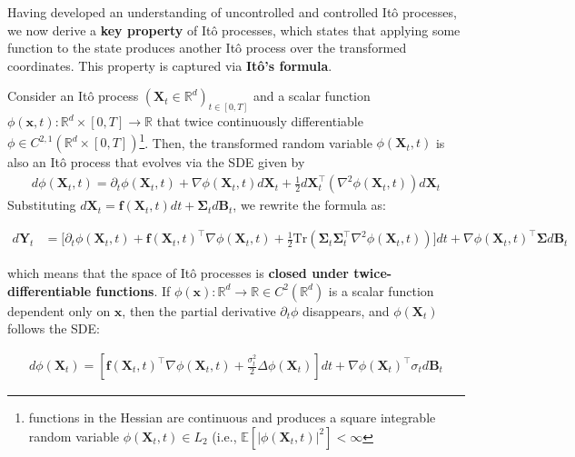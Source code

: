 \documentclass{article}
\newcommand{\boldtext}[1]{\textbf{\textcolor{MyGreen}{#1}}}
\begin{document}
Having developed an understanding of uncontrolled and controlled Itô processes, we now derive a \textbf{key property} of Itô processes, which states that applying some function to the state produces another Itô process over the transformed coordinates. This property is captured via \boldtext{Itô's formula}.

\begin{theorem}\label{thm:ito-formula}
Consider an Itô process $(\boldsymbol{X}_t\in \mathbb{R}^d)_{t\in [0,T]}$ and a scalar function $\phi(\boldsymbol{x},t):\mathbb{R}^d\times[0,T]\to \mathbb{R}$ that twice continuously differentiable $\phi\in C^{2,1}(\mathbb{R}^d\times [0,T])$\footnote{functions in the Hessian are continuous and produces a square integrable random variable $\phi(\boldsymbol{X}_t,t)\in L_2$ (i.e., $\mathbb{E}[|\phi(\boldsymbol{X}_t,t)|^2]< \infty$}. Then, the transformed random variable $\phi(\boldsymbol{X}_t,t)$ is also an Itô process that evolves via the SDE given by
\begin{align}
    d\phi(\boldsymbol{X}_t,t)=\partial_t\phi(\boldsymbol{X}_t,t)+\nabla \phi(\boldsymbol{X}_t,t)d\boldsymbol{X}_t+\frac{1}{2}d\boldsymbol{X}_t^{\top}(\nabla ^2\phi(\boldsymbol{X}_t,t))d\boldsymbol{X}_t\label{eq:ito-1}
\end{align}
Substituting $d\boldsymbol{X}_t=\boldsymbol{f}(\boldsymbol{X}_t, t)dt+\boldsymbol{\Sigma}_td\boldsymbol{B}_t$, we rewrite the formula as:
\begin{small}
\begin{align}
    d\boldsymbol{Y}_t&=\bigg[\partial_t\phi(\boldsymbol{X}_t,t)+\boldsymbol{f}(\boldsymbol{X}_t,t)^\top\nabla \phi(\boldsymbol{X}_t,t)+\frac{1}{2}\text{Tr}\left(\boldsymbol{\Sigma}_t\boldsymbol{\Sigma}_t^\top\nabla ^2\phi(\boldsymbol{X}_t,t)\right)\bigg]dt+\nabla \phi(\boldsymbol{X}_t,t)^\top \boldsymbol{\Sigma}d\boldsymbol{B}_t\tag{Itô's Formula}\label{eq:ito-2}
\end{align}
\end{small}
which means that the space of Itô processes is \textbf{closed under twice-differentiable functions}. If $\phi(\boldsymbol{x}):\mathbb{R}^d \to \mathbb{R}\in C^2(\mathbb{R}^d)$ is a scalar function dependent only on $\boldsymbol{x}$, then the partial derivative $\partial_t\phi$ disappears, and $\phi(\boldsymbol{X}_t)$ follows the SDE:
\begin{small}
\begin{align}
    d\phi(\boldsymbol{X}_t)=\left[\boldsymbol{f}(\boldsymbol{X}_t,t)^\top \nabla \phi(\boldsymbol{X}_t,t)+\frac{\sigma_t^2}{2}\Delta \phi(\boldsymbol{X}_t)\right]dt+ \nabla \phi(\boldsymbol{X}_t)^\top \sigma_td\boldsymbol{B}_t
\end{align}
\end{small}
\end{theorem}
\end{document}
